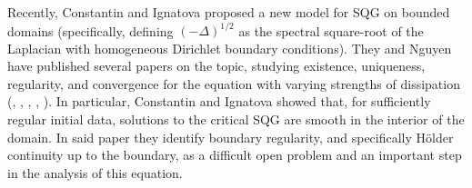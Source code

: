 Recently, Constantin and Ignatova \cite{CoIg.fraclap} proposed a new model for SQG on bounded domains (specifically, defining $(-\Delta)^{1/2}$ as the spectral square-root of the Laplacian with homogeneous Dirichlet boundary conditions).  They and Nguyen have published several papers on the topic, studying existence, uniqueness, regularity, and convergence for the equation with varying strengths of dissipation (\cite{CoIg.fraclap}, \cite{CoIg.sqg}, \cite{CoIgNg}, \cite{CoNg}, \cite{CoNg.strong}).  In particular, Constantin and Ignatova \cite{CoIg.sqg} showed that, for sufficiently regular initial data, solutions to the critical SQG are smooth in the interior of the domain.  In said paper they identify boundary regularity, and specifically H\"{o}lder continuity up to the boundary, as a difficult open problem and an important step in the analysis of this equation.  

